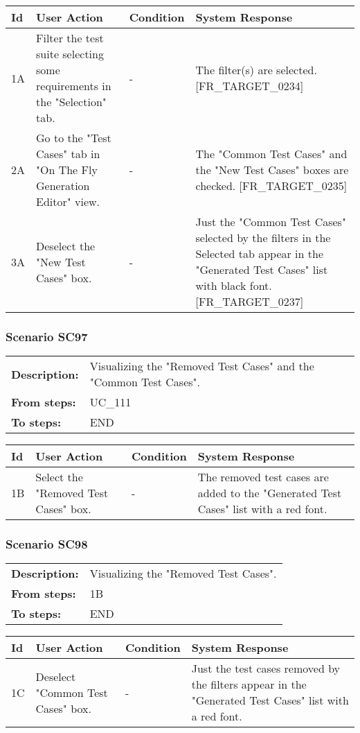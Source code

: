 \documentclass[a4paper,11pt]{article}
\newcommand{\bl}{\\ \hline}
\begin{document}
\begin{tabular}{|p{0.8in}|p{1.6in}|p{1.6in}|p{1.6in}|}
\hline
Id & User Action & Condition & System Response  \bl 
1A & Filter the test suite selecting some requirements in the
						"Selection" tab.  & - & The filter(s) are selected. [FR_TARGET_0234] \bl 
2A & Go to the "Test Cases" tab in "On The Fly Generation
						Editor" view. & - & The "Common Test Cases" and the "New Test Cases" boxes
						are checked. [FR_TARGET_0235]  \bl 
3A & Deselect the "New Test Cases" box. & - & Just the "Common Test Cases" selected by the filters in
						the Selected tab appear in the "Generated Test Cases" list with
						black font. [FR_TARGET_0237] \bl 
\end{tabular}
\subsubsection*{Scenario SC97}
\begin{tabular}{p{1in}p{4in}}
{\bf Description:} & Visualizing the "Removed Test Cases" and the "Common
					Test Cases". \\
{\bf From steps:} & UC_111#2M \\
{\bf To steps:} & END \\
\end{tabular}
 
\begin{tabular}{|p{0.8in}|p{1.6in}|p{1.6in}|p{1.6in}|}
\hline
Id & User Action & Condition & System Response  \bl 
1B & Select the "Removed Test Cases" box. & - & The removed test cases are added to the "Generated Test
						Cases" list with a red font. \bl 
\end{tabular}
\subsubsection*{Scenario SC98}
\begin{tabular}{p{1in}p{4in}}
{\bf Description:} & Visualizing the "Removed Test Cases". \\
{\bf From steps:} & 1B \\
{\bf To steps:} & END \\
\end{tabular}
 
\begin{tabular}{|p{0.8in}|p{1.6in}|p{1.6in}|p{1.6in}|}
\hline
Id & User Action & Condition & System Response  \bl 
1C & Deselect "Common Test Cases" box. & - & Just the test cases removed by the filters appear in the
						"Generated Test Cases" list with a red font. \bl 
\end{tabular}
\end{document}
